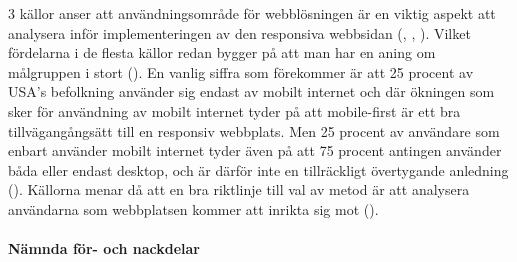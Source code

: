 \documentclass[11pt]{article}
\begin{document}
3 källor anser att användningsområde för webblösningen är en viktig aspekt att analysera inför implementeringen av den responsiva webbsidan (\cite{neocreo}, \cite{marcuspope}, \cite{designshack}). Vilket fördelarna i de flesta källor redan bygger på att man har en aning om målgruppen i stort (\cite{zurbword}). En vanlig siffra som förekommer är att 25 procent av USA’s befolkning använder sig endast av mobilt internet och där ökningen som sker för användning av mobilt internet tyder på att mobile-first är ett bra tillvägangångsätt till en responsiv webbplats.  Men 25 procent av användare som enbart använder mobilt internet tyder även på att 75 procent antingen använder båda eller endast desktop, och är därför inte en tillräckligt övertygande anledning (\cite{marcuspope}). Källorna menar då att en bra riktlinje till val av metod är att analysera användarna som webbplatsen kommer att inrikta sig mot (\cite{neocreo}). 
\newpage

\paragraph{Nämnda för- och nackdelar}\mbox{} \\
\end{document}
